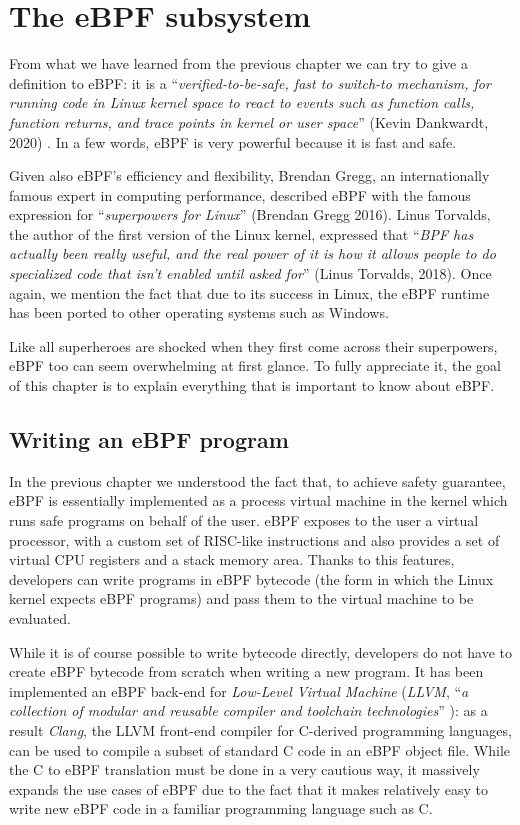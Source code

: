 \chapter{The eBPF subsystem}

From what we have learned from the previous chapter we can try to give a definition to eBPF: it is a ``\textit{verified-to-be-safe, fast to switch-to mechanism, for running code in Linux kernel space to react to events such as function calls, function returns, and trace points in kernel or user space}'' (Kevin Dankwardt, 2020) \cite{eBPFLinuxJournal}.
In a few words, eBPF is very powerful because it is fast and safe. 

Given also eBPF's efficiency and flexibility, Brendan Gregg, an internationally famous expert in computing performance, described eBPF with the famous expression for ``\textit{superpowers for Linux}'' (Brendan Gregg 2016).
Linus Torvalds, the author of the first version of the Linux kernel, expressed that ``\textit{BPF has actually been really useful, and the real power of it is how it allows people to do specialized code that isn't enabled until asked for}'' (Linus Torvalds, 2018).
Once again, we mention the fact that due to its success in Linux, the eBPF runtime has been ported to other operating systems such as Windows.

Like all superheroes are shocked when they first come across their superpowers, eBPF too can seem overwhelming at first glance.
To fully appreciate it, the goal of this chapter is to explain everything that is important to know about eBPF.

\section{Writing an eBPF program}

In the previous chapter we understood the fact that, to achieve safety guarantee, eBPF is essentially implemented as a process virtual machine in the kernel which runs safe programs on behalf of the user.
eBPF exposes to the user a virtual processor, with a custom set of RISC-like instructions and also provides a set of virtual CPU registers and a stack memory area.
Thanks to this features, developers can write programs in eBPF bytecode (the form in which the Linux kernel expects eBPF programs) and pass them to the virtual machine to be evaluated.

While it is of course possible to write bytecode directly, developers do not have to create eBPF bytecode from scratch when writing a new program.
It has been implemented an eBPF back-end for \textit{Low-Level Virtual Machine} (\textit{LLVM}, ``\textit{a collection of modular and reusable compiler and toolchain technologies}'' \cite{LLVMWebsite}): as a result \textit{Clang}, the LLVM front-end compiler for C-derived programming languages, can be used to compile a subset of standard C code in an eBPF object file.
While the C to eBPF translation must be done in a very cautious way, it massively expands the use cases of eBPF due to the fact that it makes relatively easy to write new eBPF code in a familiar programming language such as C.

